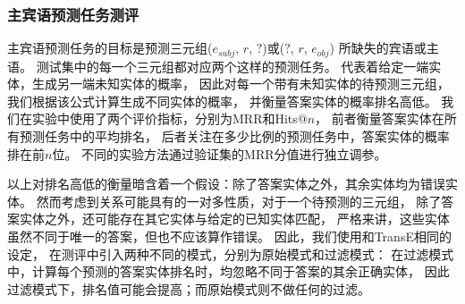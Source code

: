 \subsubsection{主宾语预测任务测评}
主宾语预测任务的目标是预测三元组($e_{subj}$, $r$, $?$)或($?$, $r$, $e_{obj}$)
所缺失的宾语或主语。
测试集中的每一个三元组都对应两个这样的预测任务。
代表着给定一端实体，生成另一端未知实体的概率，
因此对每一个带有未知实体的待预测三元组，我们根据该公式计算生成不同实体的概率，
并衡量答案实体的概率排名高低。
我们在实验中使用了两个评价指标，分别为MRR和Hits@$n$，
前者衡量答案实体在所有预测任务中的平均排名，
后者关注在多少比例的预测任务中，答案实体的概率排在前$n$位。
不同的实验方法通过验证集的MRR分值进行独立调参。

以上对排名高低的衡量暗含着一个假设：除了答案实体之外，其余实体均为错误实体。
然而考虑到关系可能具有的一对多性质，对于一个待预测的三元组，
除了答案实体之外，还可能存在其它实体与给定的已知实体匹配，
严格来讲，这些实体虽然不同于唯一的答案，但也不应该算作错误。
因此，我们使用和TransE\cite{bordes2013translating}相同的设定，
在测评中引入两种不同的模式，分别为原始模式和过滤模式：
在过滤模式中，计算每个预测的答案实体排名时，均忽略不同于答案的其余正确实体，
因此过滤模式下，排名值可能会提高；而原始模式则不做任何的过滤。

%
%


